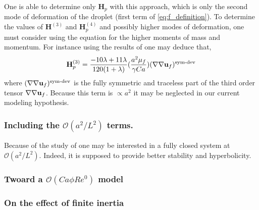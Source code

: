 One is able to determine only $\textbf{H}_p$ with this approach, which is only the second mode of deformation  of the droplet (first term of \ref{eq:f_definition}).
To determine the values of $\textbf{H}^{(3)}$ and $\textbf{H}_p^{(4)}$ and possibly higher modes of deformation, one must consider using the equation for the higher moments of mass and momentum.
For instance using the results of \citet{nadim1991motion} one may deduce that, 
\begin{equation}
    \textbf{H}_p^{(3)}
    =
    \frac{-10\lambda + 11\lambda}{120(1+\lambda)}(\frac{a^2\mu_f}{\gamma Ca})
    (\mathbf{\nabla}\mathbf{\nabla} \textbf{u}_f)^\text{sym-dev}
\end{equation}
where $(\mathbf{\nabla}\mathbf{\nabla} \textbf{u}_f)^\text{sym-dev}$ is the fully symmetric and traceless part of the third order tensor $\mathbf{\nabla}\mathbf{\nabla} \textbf{u}_f$. 
Because this term is $\propto a^2$ it may be neglected in our current modeling hypothesis. 


\subsubsection{Including the $\mathcal{O}(a^2/L^2)$ terms. }

Because of the study of \citet{prosperetti1995finite} one may be interested in a fully closed system at $\mathcal{O}(a^2/L^2)$. 
Indeed, it is supposed to provide better stability and hyperbolicity. 


\subsubsection{Twoard a $\mathcal{O}(Ca \phi Re^0)$ model}




\subsubsection{On the effect of finite inertia}

